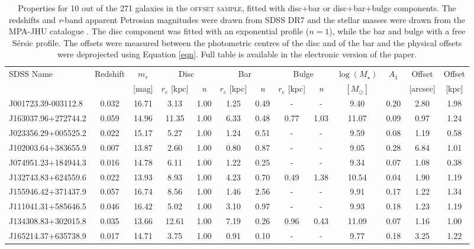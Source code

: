 \documentclass[a4paper,fleqn,usenatbib,useAMS]{mnras}
\begin{document}
\begin{table*}
\center
\begin{tabular}{lcccccccccccc}
\hline\hline
SDSS Name & Redshift & $m_{r}$ & \multicolumn{2}{c}{Disc} & \multicolumn{2}{c}{Bar}  &  \multicolumn{2}{c}{Bulge} & $\log(M_{\star}) $ & $A_{1} $ & Offset & Offset\\
& &[mag] & \textit{$r_{e}$} [kpc] &  \textit{n} &  \textit{$r_{e}$} [kpc] & \textit{n} &  \textit{$r_{e}$} [kpc] &  \textit{n}  & $[M_{\odot}]$  & & [arcsec] &  [kpc]\\\hline
J001723.39-003112.8 & 0.032 & 16.71 & 3.13  & 1.00  & 1.25  & 0.49 & - & - & 9.40 & 0.20 &  2.80 & 1.98\\
J163037.96+272744.2  & 0.059 & 14.96 & 11.35 & 1.00 & 6.33  & 0.48  & 0.77 & 1.03 & 11.07 & 0.09 & 0.97 & 1.24\\
J023356.29+005525.2  & 0.022 & 15.17 & 5.27 & 1.00  & 1.24  & 0.51 & - & - & 9.59 & 0.08 & 1.19 & 0.58\\
J102003.64+383655.9  & 0.007 & 13.87 & 2.60  & 1.00  & 0.80  & 0.87 & - & - & 9.05 & 0.28 & 6.84 & 1.01\\
J074951.23+184944.3  & 0.016 & 14.78 & 6.11  & 1.00 & 1.22  & 0.25  & - & - & 9.34 & 0.07  & 1.08 & 0.38\\
J132743.83+624559.6  & 0.022 & 13.93 & 8.93  & 1.00 & 4.23  & 0.70  & 0.49 & 1.38 & 10.54  & 0.04 & 1.90 & 1.19\\
J155946.42+371437.9 & 0.057 & 16.74 & 8.56 & 1.00  & 1.46  & 2.56  & - & - & 9.91 & 0.17 & 1.22 & 1.34\\
J111041.31+585646.5 & 0.046 & 16.42 & 5.02  & 1.00 & 3.10  & 0.97  & - & - & 9.93 & 0.18 & 1.23 & 1.19\\
J134308.83+302015.8 & 0.035 & 13.66 & 12.61  & 1.00 & 7.19  & 0.26  & 0.96 & 0.43 & 11.09 & 0.07 & 1.16 & 1.00\\
J165214.37+635738.9 & 0.017 & 14.71 & 3.75  & 1.00 & 0.91  & 0.10  & - & - & 9.77 & 0.18 & 3.25 & 1.22\\
\hline
\end{tabular}
\caption{Properties for 10 out of the 271 galaxies in the \textsc{offset sample}, fitted with disc+bar or disc+bar+bulge components. The redshifts and \textit{r}-band apparent Petrosian magnitudes were drawn from SDSS DR7 and the stellar masses were drawn from the MPA-JHU catalogue \citep{Kauffmann2003a}. The disc component was fitted with an exponential profile ($n=1$), while the bar and bulge with a free S\'ersic profile. The offsets were measured between the photometric centres of the disc and of the bar and the physical offsets were deprojected using Equation \ref{eqn}. Full table is available in the electronic version of the paper.}
\label{fitting_results}
\end{table*}
\end{document}
